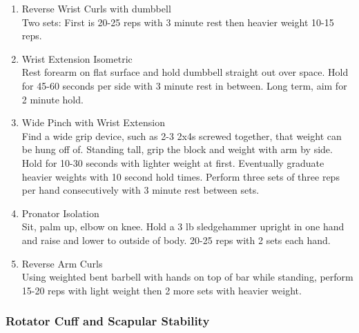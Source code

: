 \documentclass[12pt, letterpaper]{article}
\begin{document}
\begin{enumerate}
    \item Reverse Wrist Curls with dumbbell \\ 
          Two sets: First is 20-25 reps with 3 minute rest then heavier weight 10-15 reps.
    \item Wrist Extension Isometric \\ 
          Rest forearm on flat surface and hold dumbbell straight out over space. Hold for 
          45-60 seconds per side with 3 minute rest in between. Long term, aim for 2 minute hold.
    \item Wide Pinch with Wrist Extension \\ 
          Find a wide grip device, such as 2-3 2x4s screwed together, that weight can be hung 
          off of. Standing tall, grip the block and weight with arm by side. Hold for 
          10-30 seconds with lighter weight at first. Eventually graduate heavier weights 
          with 10 second hold times. Perform three sets of three reps per hand consecutively 
          with 3 minute rest between sets.
    \item Pronator Isolation \\ 
          Sit, palm up, elbow on knee. Hold a 3 lb sledgehammer upright in one hand and raise and 
          lower to outside of body. 20-25 reps with 2 sets each hand.
    \item Reverse Arm Curls \\ 
          Using weighted bent barbell with hands on top of bar while standing, perform 15-20 reps 
          with light weight then 2 more sets with heavier weight.
\end{enumerate}

\subsubsection{Rotator Cuff and Scapular Stability}
\end{document}
